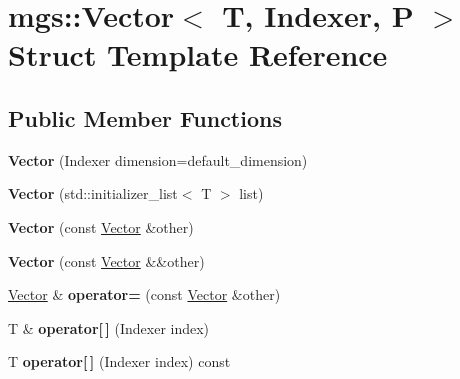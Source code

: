 \hypertarget{structmgs_1_1Vector}{}\section{mgs\+:\+:Vector$<$ T, Indexer, P $>$ Struct Template Reference}
\label{structmgs_1_1Vector}
\subsection*{Public Member Functions}
\begin{DoxyCompactItemize}
\item 
\mbox{\label{structmgs_1_1Vector_ac82fe73103a805d2b929271abd06df1b}} 
{\bfseries Vector} (Indexer dimension=default\+\_\+dimension)
\item 
\mbox{\label{structmgs_1_1Vector_a6c7ad784dc1039836c852aee99032f9d}} 
{\bfseries Vector} (std\+::initializer\+\_\+list$<$ T $>$ list)
\item 
\mbox{\label{structmgs_1_1Vector_ad3730c7cb5cd6795b221367f862fd40b}} 
{\bfseries Vector} (const \hyperlink{structmgs_1_1Vector}{Vector} \&other)
\item 
\mbox{\label{structmgs_1_1Vector_adc94ba7d7dae523f54c21c4a1a677597}} 
{\bfseries Vector} (const \hyperlink{structmgs_1_1Vector}{Vector} \&\&other)
\item 
\mbox{\label{structmgs_1_1Vector_a90ec82d588bf9762cc3869e84dd17acd}} 
\hyperlink{structmgs_1_1Vector}{Vector} \& {\bfseries operator=} (const \hyperlink{structmgs_1_1Vector}{Vector} \&other)
\item 
\mbox{\label{structmgs_1_1Vector_a865dce16bb24c095efc3aa2362e5e966}} 
T \& {\bfseries operator\mbox{[}$\,$\mbox{]}} (Indexer index)
\item 
\mbox{\label{structmgs_1_1Vector_ad086f4a895249da9ba5490b265df31a6}} 
T {\bfseries operator\mbox{[}$\,$\mbox{]}} (Indexer index) const
\item 
\mbox{\label{structmgs_1_1Vector_a4c3d9a6da7f232bde3468129b69925a9}} 

\end{DoxyCompactItemize}
